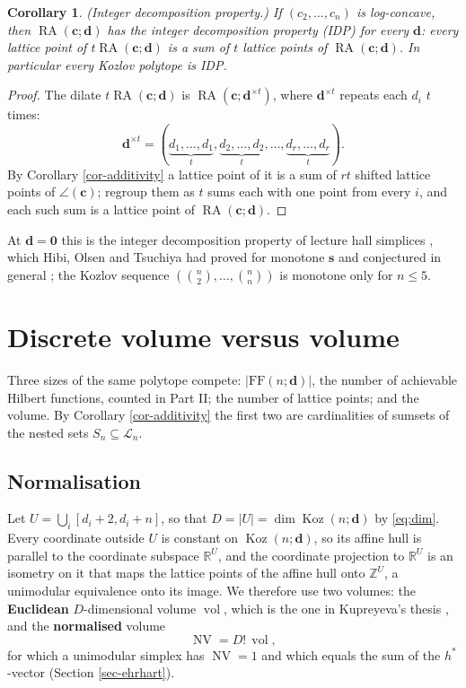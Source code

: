\documentclass[11pt, a4paper, abstract=yes]{scrartcl}
\theoremstyle{definition}
\theoremstyle{remark}
\theoremstyle{plain}
\newtheorem{corollary}[definition]{Corollary}
\newcommand{\vek}[1]{\boldsymbol{#1}}
\theoremstyle{remark}
\theoremstyle{plain}
\newcommand{\Koz}{\operatorname{Koz}}
\newcommand{\rasimp}{\angle}
\newcommand{\RA}{\operatorname{RA}}
\newcommand{\FF}{\mathrm{FF}}
\newcommand{\NV}{\operatorname{NV}}
\newcommand{\vol}{\operatorname{vol}}
\newcommand{\leandiscof}[1]{\tikz[baseline=-0.6ex]\fill[#1] (0,0) circle (0.6ex);}
\newcommand{\leanfull}{\leandiscof{leanfull}}
\newcommand{\leanmark}[1]{\leavevmode{\reversemarginpar\marginnote{\raggedleft#1}}}
\let\autocite\cite
\begin{document}
\begin{corollary}
\leanmark{\leanfull}(\emph{Integer decomposition property.}) If \((c_2,\dots,c_n)\) is log-concave, then
\(\RA(\vek c;\vek d)\) has the integer decomposition property (IDP) for every \(\vek d\): every lattice
point of \(t\RA(\vek c;\vek d)\) is a sum of \(t\) lattice points of \(\RA(\vek c;\vek d)\). In
particular every Kozlov polytope is IDP.
\label{cor-idp}
\end{corollary}

\begin{proof}
The dilate \(t\RA(\vek c;\vek d)\) is \(\RA(\vek c;\vek d^{\times t})\), where \(\vek d^{\times t}\) repeats
each \(d_i\) \(t\) times:
\[
  \vek d^{\times t}=(\underbrace{d_1,\dots,d_1}_{t},\underbrace{d_2,\dots,d_2}_{t},\dots,\underbrace{d_r,\dots,d_r}_{t}).
\]
By Corollary \ref{cor-additivity} a lattice point of it is a sum of \(rt\) shifted
lattice points of \(\rasimp(\vek c)\); regroup them as \(t\) sums each with one point from every
\(i\), and each such sum is a lattice point of \(\RA(\vek c;\vek d)\).
\end{proof}

At \(\vek d=\vek 0\) this is the integer decomposition property of lecture hall simplices
\autocite{BrandenSolus2020}, which Hibi, Olsen and Tsuchiya had proved for monotone \(\vek s\) and
conjectured in general \autocite{HibiOlsenTsuchiya2018}; the Kozlov sequence
\((\binom n2,\dots,\binom nn)\) is monotone only for \(n\le5\).
\section{Discrete volume versus volume}
\label{sec-volume}
Three sizes of the same polytope compete: \(\lvert\FF(n;\vek d)\rvert\), the number of achievable
Hilbert functions, counted in Part II; the number of lattice points; and the volume. By
Corollary \ref{cor-additivity} the first two are cardinalities of sumsets of the nested sets
\(S_n\subseteq\mathcal L_n\).
\subsection{Normalisation}
\label{sec:org4a7fd9d}

Let \(U=\bigcup_i[d_i+2,d_i+n]\), so that \(D=\lvert U\rvert=\dim\Koz(n;\vek d)\) by \eqref{eq:dim}. Every coordinate outside
\(U\) is constant on \(\Koz(n;\vek d)\), so its affine hull is parallel to the coordinate subspace
\(\mathbb R^U\), and the coordinate projection to \(\mathbb R^U\) is an isometry on it that maps the
lattice points of the affine hull onto \(\mathbb Z^U\), a unimodular equivalence onto its image. We
therefore use two volumes: the \textbf{Euclidean} \(D\)-dimensional volume \(\vol\), which is the one in
Kupreyeva's thesis \autocite{Kupreyeva2019}, and the \textbf{normalised} volume
\begin{equation}\label{eq:NV}
  \NV=D!\,\vol ,
\end{equation}
for which a unimodular simplex has \(\NV=1\) and which equals the sum of the \(h^*\)-vector
(Section \ref{sec-ehrhart}).
\end{document}
